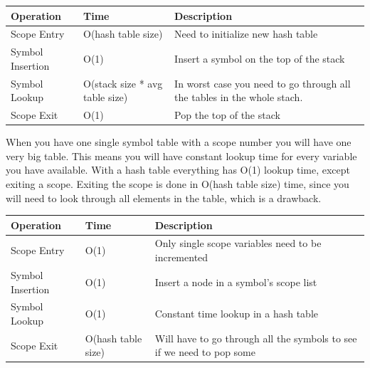\documentclass[paper=a4, fontsize=11pt]{scrartcl} %
\numberwithin{equation}{section} %
\numberwithin{figure}{section} %
\numberwithin{table}{section} %
\begin{document}
\begin{table}[ht!]
    \begin{center}
    \begin{tabular}{| l | l | p{6cm} |}
    \hline
    Operation  & Time & Description \\
    \hline
    Scope Entry & O(hash table size) & Need to initialize new hash table \\
    \hline
    Symbol Insertion & O(1) & Insert a symbol on the top of the stack \\
    \hline
    Symbol Lookup & O(stack size * avg table size) & In worst case you need to go through all the tables in the whole stach. \\
    \hline
    Scope Exit & O(1) & Pop the top of the stack \\
    \hline
    \end{tabular}
    \end{center}
\end{table}

When you have one single symbol table with a scope number you will have one very big table.
This means you will have constant lookup time for every variable you have available.
With a hash table everything has O(1) lookup time, except exiting a scope.
Exiting the scope is done in O(hash table size) time, since you will need to look through all elements in the table, which is a drawback.

\begin{table}[ht!]
    \begin{center}
    \begin{tabular}{| l | l | p{6cm} |}
    \hline
    Operation  & Time & Description \\
    \hline
    Scope Entry & O(1) & Only single scope variables need to be incremented \\
    \hline
    Symbol Insertion & O(1) & Insert a node in a symbol's scope list \\
    \hline
    Symbol Lookup & O(1) & Constant time lookup in a hash table \\
    \hline
    Scope Exit & O(hash table size) & Will have to go through all the symbols to see if we need to pop some \\
    \hline
    \end{tabular}
    \end{center}
\end{table}
\end{document}
